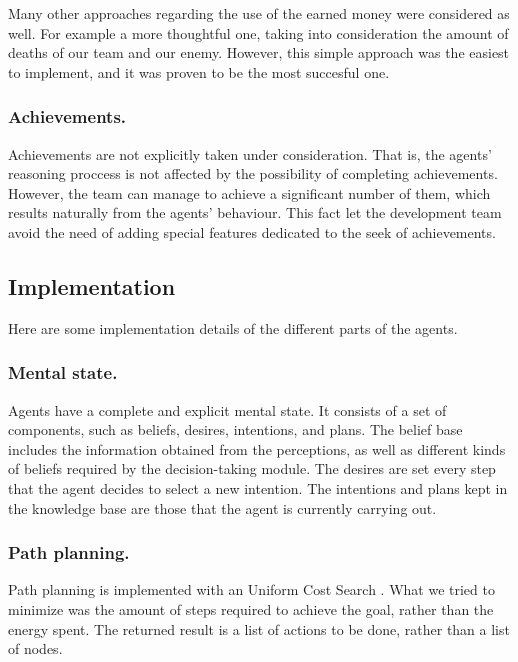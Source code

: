 \documentclass{llncs2e/llncs}
\begin{document}
    Many other approaches regarding the use of the earned money were considered as well.
    For example a more thoughtful one, taking into consideration the amount of deaths 
    of our team and our enemy. However, this simple approach was the easiest to implement, 
    and it was proven to be the most succesful one.

\subsubsection{Achievements.}

    Achievements are not explicitly taken under consideration. That is, the agents'
    reasoning proccess is not affected by the possibility of completing achievements.    
    However, the team can manage to achieve a significant number of them, which 
    results naturally from the agents' behaviour. 
    This fact let the development team avoid the need of adding special features 
    dedicated to the seek of achievements.
    
\subsection{Implementation}

    Here are some implementation details of the different parts of the agents.
    
\subsubsection{Mental state.}

    Agents have a complete and explicit mental state. It consists of a set of 
    components, such as beliefs, desires, intentions, and plans. 
    The belief base includes the information obtained from the perceptions, as
    well as different kinds of beliefs required by the decision-taking module.
    The desires are set every step that the agent decides to select a new intention.
    The intentions and plans kept in the knowledge base are those that the agent
    is currently carrying out.
    
\subsubsection{Path planning.}

    Path planning is implemented with an Uniform Cost Search 
    \cite{Russell:2003:AIM:773294}. 
    What we tried to minimize was the amount of steps required to achieve the 
    goal, rather than the energy spent. 
    The returned result is a list of actions to be done, rather than a list of 
    nodes.
    
\end{document}
